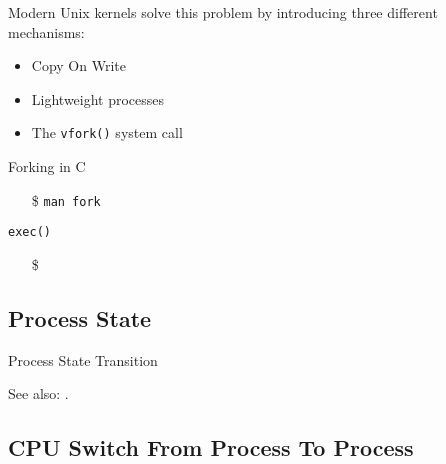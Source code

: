 Modern Unix kernels solve this problem by introducing three different mechanisms:
\begin{itemize}
\item Copy On Write
\item Lightweight processes
\item The \texttt{vfork()} system call
\end{itemize}


\begin{frame}{Forking in C}
  \begin{center}
  \end{center}
  \begin{itemize}
  \item[\$] \texttt{man fork}
  \end{itemize}
\end{frame}

\begin{frame}{\texttt{exec()}}
  \begin{center}
  \end{center}
  \begin{itemize}
  \item[\$] 
  \end{itemize}
\end{frame}

\subsection{Process State}

\begin{frame}{Process State Transition}
  \begin{center}
  \end{center}
\end{frame}

See also: .

\subsection{CPU Switch From Process To Process}
\label{sec:cpu-switch-from}

